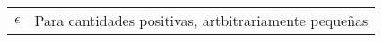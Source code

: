 \begin{table}[ht!]
\begin{center}
\begin{tabularx}{\textwidth}{|l|X|}
            $ \epsilon $                                      & Para cantidades positivas, artbitrariamente pequeñas                                                                        \\


\end{tabularx}
\end{center}
\end{table}

